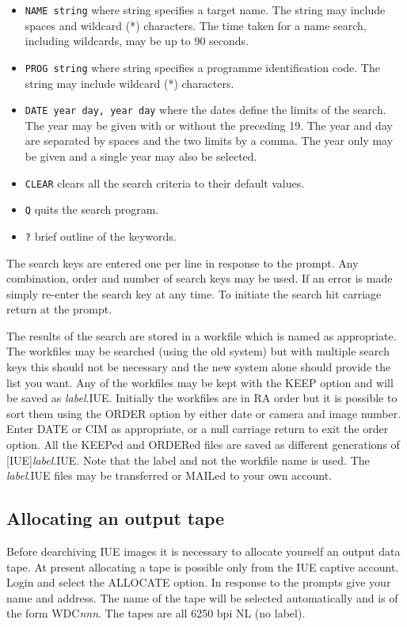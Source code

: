 \begin{itemize}
\item {\tt NAME string} where string specifies a target name. The string may include
spaces and wildcard (*) characters. The time taken for a name search, including
wildcards, may be up to 90 seconds.

\item {\tt PROG string} where string specifies a programme identification code.
The string may include wildcard (*) characters.

\item {\tt DATE year day, year day} where the dates define the limits of the search.
The year may be given with or without the preceding 19.
The year and day are separated by spaces and the two limits by a comma.
The year only may be given and a single year may also be selected. 

\item {\tt CLEAR} clears all the search criteria to their default values.

\item {\tt Q} quits the search program.

\item {\tt ?} brief outline of the keywords.

\end{itemize}

The search keys are entered one per line in response to the prompt.
Any combination, order and number of search keys may be used. 
If an error is made simply re-enter the search key at any time.
To initiate the search hit carriage return at the prompt.

The results of the search are stored in a workfile which is named as
appropriate.
The workfiles may be searched (using the old system) but with multiple search
keys this should not be necessary and the new system alone should provide the 
list you want. 
Any of the workfiles may be kept with the KEEP option
and will be saved as {\it label}.IUE.
Initially the workfiles are
in RA order but it is possible to sort them using the ORDER option 
by either date or camera and image number. Enter DATE or CIM as appropriate, or
a null carriage return to exit the order option.
All the KEEPed and ORDERed files are saved as different
generations of [IUE]{\it label}.IUE. 
Note that the label and not the workfile name is used.
The {\it label}.IUE files may be transferred or MAILed to your own account.

\subsection {Allocating an output tape}
\label{allocate}
Before dearchiving IUE images it is necessary to allocate yourself an
output data tape.
At present allocating a tape is possible only from the IUE captive account.
Login and select the ALLOCATE option. In response to the prompts 
give your name and address. 
The name of the tape will be selected automatically and is of the form
WDC{\it nnn}.
The tapes are all 6250 bpi NL (no label).

